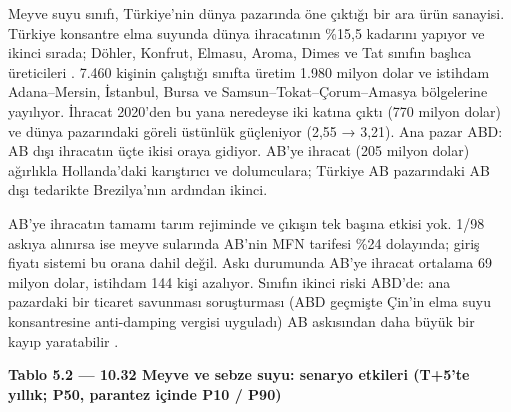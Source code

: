 Meyve suyu sınıfı, Türkiye'nin dünya pazarında öne çıktığı bir ara ürün sanayisi. Türkiye konsantre elma suyunda dünya ihracatının \%15,5 kadarını yapıyor ve ikinci sırada; Döhler, Konfrut, Elmasu, Aroma, Dimes ve Tat sınıfın başlıca üreticileri \etiketH{}. 7.460 kişinin çalıştığı sınıfta üretim 1.980 milyon dolar ve istihdam Adana--Mersin, İstanbul, Bursa ve Samsun--Tokat--Çorum--Amasya bölgelerine yayılıyor. İhracat 2020'den bu yana neredeyse iki katına çıktı (770 milyon dolar) ve dünya pazarındaki göreli üstünlük güçleniyor (2,55 → 3,21). Ana pazar ABD: AB dışı ihracatın üçte ikisi oraya gidiyor. AB'ye ihracat (205 milyon dolar) ağırlıkla Hollanda'daki karıştırıcı ve dolumculara; Türkiye AB pazarındaki AB dışı tedarikte Brezilya'nın ardından ikinci.

AB'ye ihracatın tamamı tarım rejiminde ve çıkışın tek başına etkisi yok. 1/98 askıya alınırsa ise meyve sularında AB'nin MFN tarifesi \%24 dolayında; giriş fiyatı sistemi bu orana dahil değil. Askı durumunda AB'ye ihracat ortalama 69 milyon dolar, istihdam 144 kişi azalıyor. Sınıfın ikinci riski ABD'de: ana pazardaki bir ticaret savunması soruşturması (ABD geçmişte Çin'in elma suyu konsantresine anti-damping vergisi uyguladı) AB askısından daha büyük bir kayıp yaratabilir \etiketH{}.


\textbf{Tablo 5.2 --- 10.32 Meyve ve sebze suyu: senaryo etkileri (T+5'te yıllık; P50, parantez içinde P10 / P90)}

\nopagebreak[4]

\begingroup\gbtablo\footnotesize

